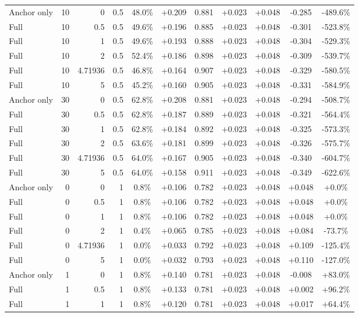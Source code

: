 \begin{table}[htbp]
\begin{tabular}{lrrrccccccc}
Anchor only & 10 & 0 & 0.5 & 48.0\% & +0.209 & 0.881 & +0.023 & +0.048 & -0.285 & -489.6\% \\
Full & 10 & 0.5 & 0.5 & 49.6\% & +0.196 & 0.885 & +0.023 & +0.048 & -0.301 & -523.8\% \\
Full & 10 & 1 & 0.5 & 49.6\% & +0.193 & 0.888 & +0.023 & +0.048 & -0.304 & -529.3\% \\
Full & 10 & 2 & 0.5 & 52.4\% & +0.186 & 0.898 & +0.023 & +0.048 & -0.309 & -539.7\% \\
Full & 10 & 4.71936 & 0.5 & 46.8\% & +0.164 & 0.907 & +0.023 & +0.048 & -0.329 & -580.5\% \\
Full & 10 & 5 & 0.5 & 45.2\% & +0.160 & 0.905 & +0.023 & +0.048 & -0.331 & -584.9\% \\
Anchor only & 30 & 0 & 0.5 & 62.8\% & +0.208 & 0.881 & +0.023 & +0.048 & -0.294 & -508.7\% \\
Full & 30 & 0.5 & 0.5 & 62.8\% & +0.187 & 0.889 & +0.023 & +0.048 & -0.321 & -564.4\% \\
Full & 30 & 1 & 0.5 & 62.8\% & +0.184 & 0.892 & +0.023 & +0.048 & -0.325 & -573.3\% \\
Full & 30 & 2 & 0.5 & 63.6\% & +0.181 & 0.899 & +0.023 & +0.048 & -0.326 & -575.7\% \\
Full & 30 & 4.71936 & 0.5 & 64.0\% & +0.167 & 0.905 & +0.023 & +0.048 & -0.340 & -604.7\% \\
Full & 30 & 5 & 0.5 & 64.0\% & +0.158 & 0.911 & +0.023 & +0.048 & -0.349 & -622.6\% \\
Anchor only & 0 & 0 & 1 & 0.8\% & +0.106 & 0.782 & +0.023 & +0.048 & +0.048 & +0.0\% \\
Full & 0 & 0.5 & 1 & 0.8\% & +0.106 & 0.782 & +0.023 & +0.048 & +0.048 & +0.0\% \\
Full & 0 & 1 & 1 & 0.8\% & +0.106 & 0.782 & +0.023 & +0.048 & +0.048 & +0.0\% \\
Full & 0 & 2 & 1 & 0.4\% & +0.065 & 0.785 & +0.023 & +0.048 & +0.084 & -73.7\% \\
Full & 0 & 4.71936 & 1 & 0.0\% & +0.033 & 0.792 & +0.023 & +0.048 & +0.109 & -125.4\% \\
Full & 0 & 5 & 1 & 0.0\% & +0.032 & 0.793 & +0.023 & +0.048 & +0.110 & -127.0\% \\
Anchor only & 1 & 0 & 1 & 0.8\% & +0.140 & 0.781 & +0.023 & +0.048 & -0.008 & +83.0\% \\
Full & 1 & 0.5 & 1 & 0.8\% & +0.133 & 0.781 & +0.023 & +0.048 & +0.002 & +96.2\% \\
Full & 1 & 1 & 1 & 0.8\% & +0.120 & 0.781 & +0.023 & +0.048 & +0.017 & +64.4\% \\

\end{tabular}
\end{table}
